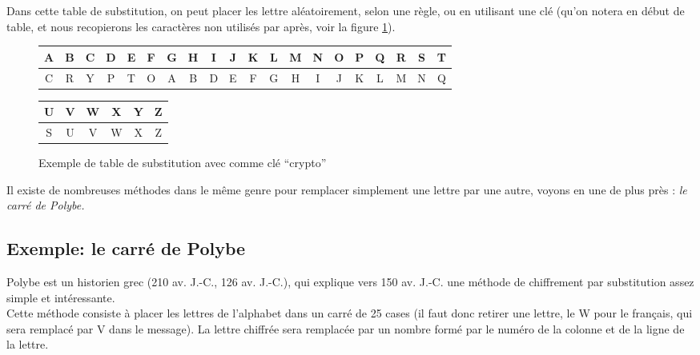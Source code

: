 Dans cette table de substitution, on peut placer les lettre
aléatoirement, selon une règle, ou en utilisant une clé (qu'on notera
en début de table, et nous recopierons les caractères non utilisés par
après, voir la figure \ref{fig:substitutioncle}).

\begin{figure}[h]
  \begin{center}
    \begin{tabular}{|c|c|c|c|c|c|c|c|c|c|c|c|c|c|c|c|c|c|c|c}
      \hline
      A & B & C & D & E & F & G & H & I & J & K & L & M & N & O & P &
      Q & R & S & T \\
      \hline
      C & R & Y & P & T & O & A & B & D & E & F & G & H & I & J & K &
      L & M & N  & Q  \\
      \hline
    \end{tabular}
  \end{center}
  \begin{flushright}
    \begin{tabular}{c|c|c|c|c|c|}
      \hline
      U & V & W & X & Y & Z  \\
      \hline
      S & U & V & W & X & Z \\
      \hline
    \end{tabular}
  \end{flushright}
  \caption{Exemple de table de substitution avec comme clé ``crypto''}
  \label{fig:substitutioncle}
\end{figure}

Il existe de nombreuses méthodes dans le même genre pour remplacer
simplement une lettre par une autre, voyons en une de plus près :
\emph{le carré de Polybe.}\\

\subsection{Exemple: le carré de Polybe\label{syst:carrepolybe}}
Polybe est un historien grec (210 av. J.-C., 126 av. J.-C.), qui
explique vers 150 av. J.-C. une méthode de chiffrement par
substitution assez simple et intéressante.\\

Cette méthode consiste à placer les lettres de l'alphabet dans un
carré de 25 cases (il faut donc retirer une lettre, le W pour le
français, qui sera remplacé par V dans le message). La lettre chiffrée
sera remplacée par un nombre formé par le numéro de la colonne et de
la ligne de la lettre.\\

